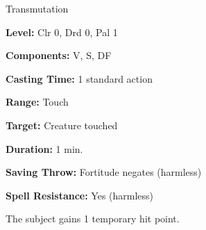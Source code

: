 
Transmutation

\textbf{Level:} Clr 0, Drd 0, Pal 1

\textbf{Components:} V, S, DF

\textbf{Casting Time:} 1 standard action

\textbf{Range:} Touch

\textbf{Target:} Creature touched

\textbf{Duration:} 1 min.

\textbf{Saving Throw:} Fortitude negates (harmless)

\textbf{Spell Resistance:} Yes (harmless)

The subject gains 1 temporary hit point.

